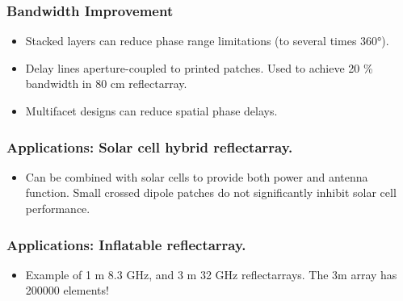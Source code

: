 \begin{frame}[allowframebreaks]
\frametitle{Bandwidth Improvement}
\begin{itemize}
\item Stacked layers can reduce phase range limitations (to several times \ang{360}).
\citep{pozar1997design}
\item Delay lines aperture-coupled to printed patches.  Used to achieve 20 \% bandwidth in 80 \si{cm} reflectarray.
\citep{encinar2010recent}
\item Multifacet designs can reduce spatial phase delays.
\end{itemize}
\end{frame}


\begin{frame}
\frametitle{Applications: Solar cell hybrid reflectarray.}

\begin{itemize}
\item Can be combined with solar cells to provide both power and antenna function. %
Small crossed dipole patches do not significantly inhibit solar cell performance.
\end{itemize}
\end{frame}

\begin{frame}
\frametitle{Applications: Inflatable reflectarray.}

\begin{itemize}
\item
Example of 1 \si{m} 8.3 \si{GHz}, and 3 \si{m} 32 \si{GHz} reflectarrays.  The 3\si{m} array has 200000 elements!
\end{itemize}

\end{frame}

